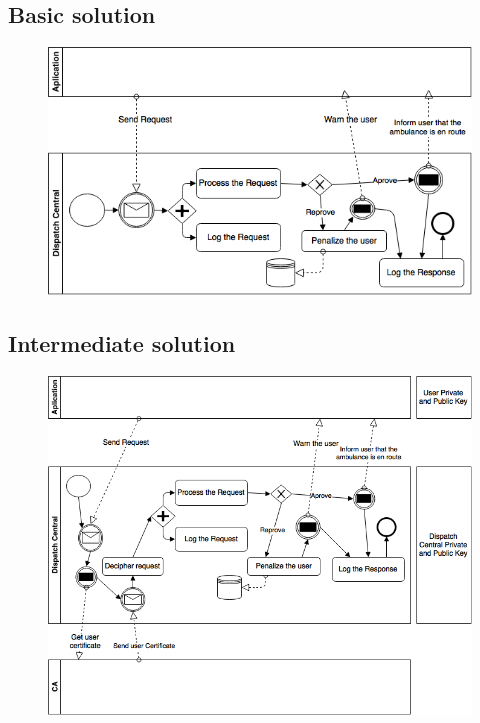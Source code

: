 \documentclass[a4paper,titlepage,11pt]{article}
\begin{document}
\subsection{Basic solution}
\begin{figure}[h]
    \centering
    \includegraphics[scale=0.60]{img/basic-solution.png}
\end{figure}

\subsection{Intermediate solution}
\begin{figure}[h]
    \centering
    \includegraphics[scale=0.50]{img/intermediate-solution.png}
\end{figure}

\newpage
\end{document}
